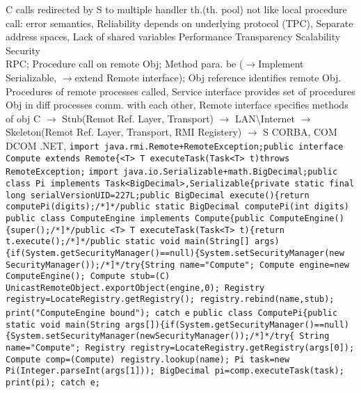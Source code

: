 C calls redirected by S to multiple handler th.(th. pool)
\textbar \textbar \textbar
{}
not like local procedure call:
error semantics,
Reliability depends on underlying protocol (TPC),
Separate address spaces,
Lack of shared variables 
\bluetext{+}
Performance Transparency
\bluetext{+}
Scalability
\bluetext{+}
Security
\\
 RPC;
Procedure call on remote Obj;
Method para. be 
($\rightarrow$Implement Serializable, 
$\rightarrow$extend Remote interface);
Obj reference identifies remote Obj.
\textbar \textbar
{}
Procedures of remote processes called,
Service interface provides set of procedures
Obj in diff processes comm. with each other, 
Remote interface specifies methods of obj
\textbar
{}
C
$\rightarrow$
Stub(Remot Ref. Layer, Transport)
$\rightarrow$
LAN\textbackslash Internet
$\rightarrow$
Skeleton(Remot Ref. Layer, Transport, RMI Registery)
$\rightarrow$
S
\textbar
{}
CORBA, COM DCOM .NET,
\lstinline{import java.rmi.Remote+RemoteException;public interface Compute extends Remote{<T> T executeTask(Task<T> t)throws RemoteException;}
\lstinline{import java.io.Serializable+math.BigDecimal;public class Pi implements Task<BigDecimal>,Serializable{private static final long serialVersionUID=227L;public BigDecimal execute(){return computePi(digits);/*]*/public static BigDecimal computePi(int digits)}
\lstinline{public class ComputeEngine implements Compute{public ComputeEngine(){super();/*]*/public <T> T executeTask(Task<T> t){return t.execute();/*]*/public static void main(String[] args){if(System.getSecurityManager()==null){System.setSecurityManager(new SecurityManager());/*]*/try{String name="Compute"; Compute engine=new ComputeEngine(); Compute stub=(C) UnicastRemoteObject.exportObject(engine,0); Registry registry=LocateRegistry.getRegistry(); registry.rebind(name,stub); print("ComputeEngine bound"); catch e}
\lstinline{public class ComputePi{public static void main(String args[]){if(System.getSecurityManager()==null){System.setSecurityManager(newSecurityManager());/*]*/try{ String name="Compute"; Registry registry=LocateRegistry.getRegistry(args[0]); Compute comp=(Compute) registry.lookup(name); Pi task=new Pi(Integer.parseInt(args[1])); BigDecimal pi=comp.executeTask(task); print(pi); catch e;}
